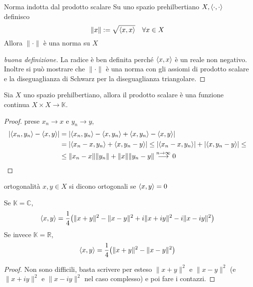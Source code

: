 \begin{definition}{Norma indotta dal prodotto scalare}
    Su uno spazio prehilbertiano \(X, {\left\langle\cdot ,\cdot \right\rangle} \) definisco 
    \[
      \|x\|:= \sqrt{{\left\langle x,x\right\rangle} } \quad \forall x \in X
    \]
    Allora \(\|\cdot \|\) è una norma su \(X\) 
\end{definition}
\begin{proof}[buona definizione]
    La radice è ben definita perché \({\left\langle x,x\right\rangle}\) è un reale non negativo.
    Inoltre si può mostrare che \(\|\cdot \|\) è una norma con gli assiomi di
    prodotto scalare e la diseguaglianza di Schwarz per la diseguaglianza
    triangolare.
\end{proof}
\begin{proposition}{}
    Sia \(X\) uno spazio prehilbertiano, allora il prodotto scalare è una
    funzione continua \(X\times X \to \mathbb{K}\).
\end{proposition}
\begin{proof}{}
prese \(x_{n}\to x\) e \(y_{n}\to y\),
    \begin{align*}
        |{\left\langle x_{n},y_{n}\right\rangle} - {\left\langle x,y\right\rangle}| &= |{\left\langle x_{n},y_{n}\right\rangle} - {\left\langle x,y_{n}\right\rangle} +
      {\left\langle x,y_{n}\right\rangle} - {\left\langle x,y\right\rangle} | \\
            &= |{\left\langle x_{n}-x,y_{n}\right\rangle} + {\left\langle x,y_{n}-y\right\rangle} | \le |{\left\langle x_{n}-x,y_{n}\right\rangle} | + |{\left\langle x, y_{n}-y\right\rangle} | \le \\
            &\le \|x_{n}-x\|\|y_{n}\| + \|x\|\|y_{n}-y\|
            \overset{n\to \infty}{\longrightarrow }0
    \end{align*}
\end{proof}

\begin{definition}{ortogonalità}
    \(x,y \in X\) si dicono ortogonali se \({\left\langle x,y\right\rangle} =0\) 
\end{definition}

\begin{proposition}
    Se \(\mathbb{K}=\mathbb{C}\),
    \[
      {\left\langle x,y\right\rangle} = \frac{1}{4}{\left( \|x+y\|^2 - \|x-y\|^2 + i\|x+iy\|^2 - i\|x-iy\|^2 \right)} 
    \]
    Se invece \(\mathbb{K}=\mathbb{R}\),
    \[
      {\left\langle x,y\right\rangle} = \frac{1}{4}{\left( \|x+y\|^2 - \|x-y\|^2\right)} 
    \]
\end{proposition}
\begin{proof}{}
    Non sono difficili, basta scrivere per esteso \(\|x+y\|^2\) e \(\|x-y\|^2\)
    (e \(\|x+iy\|^2\) e \(\|x-iy\|^2\) nel caso complesso) e poi fare i contazzi.
\end{proof}

